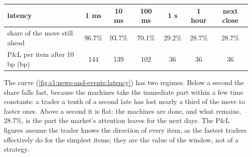 \begin{center}
\small
\begin{tabular}{@{}lcccccc@{}}
\toprule
latency & 1 ms & 10 ms & 100 ms & 1 s & 1 hour & next close\\
\midrule
share of the move still ahead & 96.7\% & 93.7\% & 70.1\% & 29.2\% & 28.7\% & 28.7\%\\
P\&L per item after 10 bp (bp) & 144 & 139 & 102 & 36 & 36 & 36\\
\bottomrule
\end{tabular}
\end{center}

The curve (\cref{fig:s1:news-and-events:latency}) has two regimes. Below a second the share falls fast, because the machines take the immediate part
within a few time constants: a trader a tenth of a second late has lost nearly a third of the move to faster ones. Above a second it is flat: the machines are
done, and what remains, 28.7\%, is the part the market's attention leaves for the next days. The P\&L figures assume the trader knows the direction of
every item, as the fastest traders effectively do for the simplest items; they are the value of the window, not of a strategy.

\begin{omfigure}

\label{fig:s1:news-and-events:latency}
\end{omfigure}

